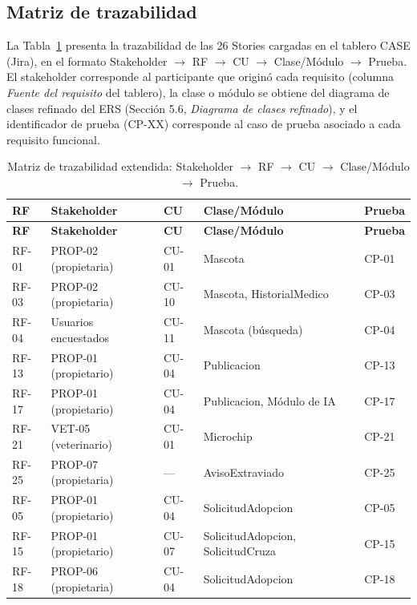 \documentclass[journal,onecolumn]{IEEEtran}
\begin{document}
	\subsection{Matriz de trazabilidad}
	
	La Tabla~\ref{tab:matriz-trazabilidad-jira} presenta la trazabilidad de las 26 Stories cargadas en el tablero CASE (Jira), en el formato Stakeholder $\rightarrow$ RF $\rightarrow$ CU $\rightarrow$ Clase/Módulo $\rightarrow$ Prueba. El stakeholder corresponde al participante que originó cada requisito (columna \textit{Fuente del requisito} del tablero), la clase o módulo se obtiene del diagrama de clases refinado del ERS (Sección 5.6, \textit{Diagrama de clases refinado}), y el identificador de prueba (CP-XX) corresponde al caso de prueba asociado a cada requisito funcional.
	
	\begin{longtable}{@{}l l l p{4.2cm} l@{}}
		\caption{Matriz de trazabilidad extendida: Stakeholder $\rightarrow$ RF $\rightarrow$ CU $\rightarrow$ Clase/Módulo $\rightarrow$ Prueba.}
		\label{tab:matriz-trazabilidad-jira} \\
		\toprule
		\textbf{RF} & \textbf{Stakeholder} & \textbf{CU} & \textbf{Clase/Módulo} & \textbf{Prueba} \\
		\midrule
		\endfirsthead
		\toprule
		\textbf{RF} & \textbf{Stakeholder} & \textbf{CU} & \textbf{Clase/Módulo} & \textbf{Prueba} \\
		\midrule
		\endhead
		RF-01 & PROP-02 (propietaria) & CU-01 & Mascota & CP-01 \\
		RF-03 & PROP-02 (propietaria) & CU-10 & Mascota, HistorialMedico & CP-03 \\
		RF-04 & Usuarios encuestados & CU-11 & Mascota (búsqueda) & CP-04 \\
		RF-13 & PROP-01 (propietario) & CU-04 & Publicacion & CP-13 \\
		RF-17 & PROP-01 (propietario) & CU-04 & Publicacion, Módulo de IA & CP-17 \\
		RF-21 & VET-05 (veterinario) & CU-01 & Microchip & CP-21 \\
		RF-25 & PROP-07 (propietaria) & --- & AvisoExtraviado & CP-25 \\
		RF-05 & PROP-01 (propietario) & CU-04 & SolicitudAdopcion & CP-05 \\
		RF-15 & PROP-01 (propietario) & CU-07 & SolicitudAdopcion, SolicitudCruza & CP-15 \\
		RF-18 & PROP-06 (propietaria) & CU-04 & SolicitudAdopcion & CP-18 \\

\end{longtable}
\end{document}
